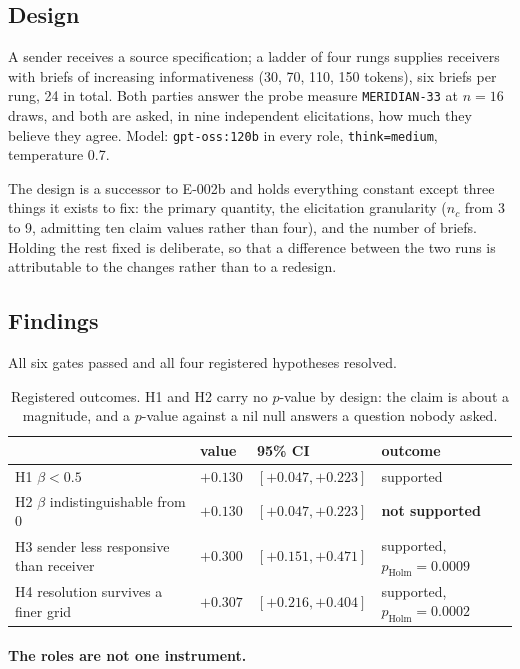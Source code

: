 \documentclass[11pt]{article}
\begin{document}
\subsection{Design}

A sender receives a source specification; a ladder of four rungs supplies
receivers with briefs of increasing informativeness (30, 70, 110, 150 tokens),
six briefs per rung, 24 in total. Both parties answer the probe measure
\texttt{MERIDIAN-33} at $n = 16$ draws, and both are asked, in nine independent
elicitations, how much they believe they agree. Model: \texttt{gpt-oss:120b} in
every role, \texttt{think=medium}, temperature 0.7.

The design is a successor to E-002b and holds everything constant except three
things it exists to fix: the primary quantity, the elicitation granularity
($n_c$ from 3 to 9, admitting ten claim values rather than four), and the number
of briefs. Holding the rest fixed is deliberate, so that a difference between
the two runs is attributable to the changes rather than to a redesign.

\subsection{Findings}

All six gates passed and all four registered hypotheses resolved.

\begin{table}[h]
\centering
\small
\begin{tabular}{llll}
\toprule
 & value & 95\% CI & outcome \\
\midrule
H1 \quad $\beta < 0.5$ & $+0.130$ & $[+0.047, +0.223]$ & supported \\
H2 \quad $\beta$ indistinguishable from 0 & $+0.130$ & $[+0.047, +0.223]$ & \textbf{not supported} \\
H3 \quad sender less responsive than receiver & $+0.300$ & $[+0.151, +0.471]$ & supported, $p_{\text{Holm}} = 0.0009$ \\
H4 \quad resolution survives a finer grid & $+0.307$ & $[+0.216, +0.404]$ & supported, $p_{\text{Holm}} = 0.0002$ \\
\bottomrule
\end{tabular}
\caption{Registered outcomes. H1 and H2 carry no $p$-value by design: the claim
is about a magnitude, and a $p$-value against a nil null answers a question
nobody asked.}
\end{table}

\paragraph{The roles are not one instrument.}
\end{document}
